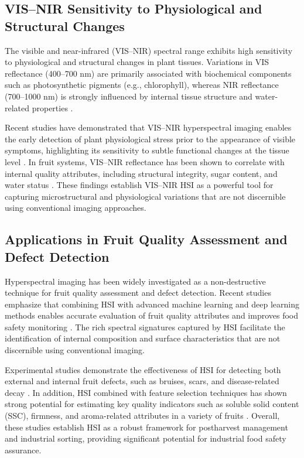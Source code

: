 \subsection{VIS--NIR Sensitivity to Physiological and Structural Changes}

\noindent
The visible and near-infrared (VIS--NIR) spectral range exhibits high sensitivity to physiological and structural changes in plant tissues. Variations in VIS reflectance (400--700 nm) are primarily associated with biochemical components such as photosynthetic pigments (e.g., chlorophyll), whereas NIR reflectance (700--1000 nm) is strongly influenced by internal tissue structure and water-related properties \cite{zhang2022reflectance, wang2024frontiers}.

\medskip
\noindent
Recent studies have demonstrated that VIS--NIR hyperspectral imaging enables the early detection of plant physiological stress prior to the appearance of visible symptoms, highlighting its sensitivity to subtle functional changes at the tissue level \cite{liu2023sensors, Abade2025SpectrumToYield}. In fruit systems, VIS--NIR reflectance has been shown to correlate with internal quality attributes, including structural integrity, sugar content, and water status \cite{sun2024fruit}. These findings establish VIS--NIR HSI as a powerful tool for capturing microstructural and physiological variations that are not discernible using conventional imaging approaches.

\subsection{Applications in Fruit Quality Assessment and Defect Detection}

\noindent
Hyperspectral imaging has been widely investigated as a non-destructive technique for fruit quality assessment and defect detection. Recent studies emphasize that combining HSI with advanced machine learning and deep learning methods enables accurate evaluation of fruit quality attributes and improves food safety monitoring \cite{yang2025jafc, frontiers2024fruit}. The rich spectral signatures captured by HSI facilitate the identification of internal composition and surface characteristics that are not discernible using conventional imaging.


\medskip
\noindent
Experimental studies demonstrate the effectiveness of HSI for detecting both external and internal fruit defects, such as bruises, scars, and disease-related decay \cite{akter2025defects, min2023decay}. In addition, HSI combined with feature selection techniques has shown strong potential for estimating key quality indicators such as soluble solid content (SSC), firmness, and aroma-related attributes in a variety of fruits \cite{zhu2025bagging, tian2023mango, kanwal2025quality}. Overall, these studies establish HSI as a robust framework for postharvest management and industrial sorting, providing significant potential for industrial food safety assurance.

